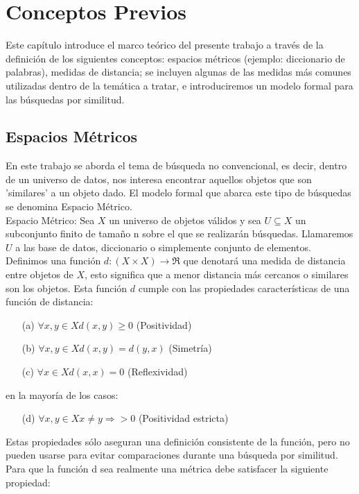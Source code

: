 \chapter{Conceptos Previos}

Este cap\'itulo introduce el marco te\'orico del presente trabajo a trav\'es de 
la definici\'on de los siguientes conceptos: espacios m\'etricos (ejemplo: diccionario de 
palabras), medidas de distancia; se incluyen algunas de las medidas m\'as comunes utilizadas 
dentro de la tem\'atica a tratar, e introduciremos un modelo formal para las b\'usquedas por 
similitud.\\

\section{Espacios M\'etricos}

En este trabajo se aborda el tema de b\'usqueda no convencional, es decir, dentro de un universo 
de datos, nos interesa encontrar aquellos objetos que son 'similares' a un objeto dado. El modelo 
formal que abarca este tipo de b\'usquedas se denomina Espacio M\'etrico.\\

Espacio M\'etrico:
Sea $X$ un universo de objetos v\'alidos y sea $U \subseteq X$ un subconjunto finito de tama\~no n 
sobre el que se realizar\'an b\'usquedas. Llamaremos $U$ a las base de datos, diccionario o 
simplemente conjunto de elementos.
Definimos una funci\'on $d:(X \times X) \rightarrow \Re$ que denotar\'a una medida de distancia 
entre objetos de $X$, esto significa que a menor distancia m\'as cercanos o similares son los 
objetos. Esta funci\'on $d$ cumple con las propiedades caracter\'isticas de una funci\'on de 
distancia:

\begin{enumerate}
\item [(a)] $\forall x,y \in X d(x,y) \geq 0$ (Positividad)
\item [(b)] $\forall x,y \in X d(x,y) = d(y,x)$ (Simetr\'ia)
\item [(c)] $\forall x \in X d(x,x) = 0 $ (Reflexividad)
\end{enumerate}
en la mayor\'ia de los casos:
\begin{enumerate}
\item [(d)]  $\forall x,y \in X x \neq y \Rightarrow > 0$ (Positividad estricta)
\end{enumerate}


Estas propiedades s\'olo aseguran una definici\'on consistente de la funci\'on, pero no pueden 
usarse para evitar comparaciones durante una b\'usqueda por similitud. Para que la funci\'on d sea 
realmente una m\'etrica debe satisfacer la siguiente propiedad:

